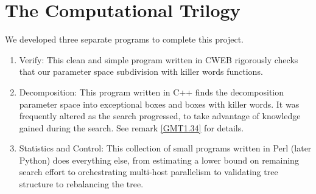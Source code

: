 \section{The Computational Trilogy}
We developed three separate programs to complete this
project.
\begin{enumerate}
	\item Verify:
		This clean and simple program written in CWEB
		rigorously checks that
		our parameter space subdivision with killer words functions.
	\item Decomposition:
		This program written in C++ finds the decomposition
		parameter space into exceptional boxes and boxes with killer words.
		It was frequently altered as the search progressed,
		to take advantage of knowledge gained during the search.
		See remark \ref{GMT1.34} for details.
	\item Statistics and Control:
		This collection of small programs written in Perl (later Python)
		does everything else,
		from estimating a lower bound on remaining search effort
		to orchestrating multi-host parallelism
		to validating tree structure to rebalancing the tree.
\end{enumerate}
